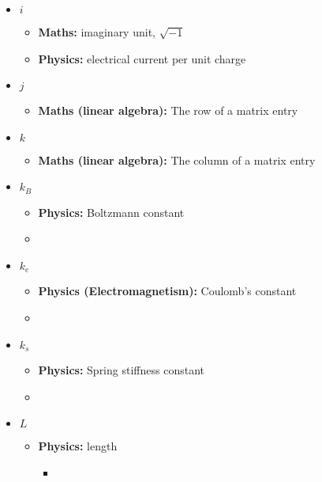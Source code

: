 \begin{itemize}
				\item $i$
				\begin{itemize}
					\item \textbf{Maths:} imaginary unit, $\sqrt{-1}$
					\item\textbf{Physics:} electrical current per unit charge
				\end{itemize}
				
				\item $j$
				\begin{itemize}
					\item\textbf{Maths (linear algebra):} The row of a matrix entry
				\end{itemize}
				
				\item $k$
				\begin{itemize}
					\item\textbf{Maths (linear algebra):} The column of a matrix entry
				\end{itemize}
				
				\item $k_B$
				\begin{itemize}
					\item\textbf{Physics:} Boltzmann constant
					\item
				\end{itemize}
				
				\item $k_e$
				\begin{itemize}
					\item\textbf{Physics (Electromagnetism):} Coulomb's constant
					\item
				\end{itemize}
				
				\item $k_s$
				\begin{itemize}
					\item\textbf{Physics:} Spring stiffness constant
					\item
				\end{itemize}
				
				\item $L$
				\begin{itemize}
					\item\textbf{Physics:} length
					\begin{itemize}
						\item 
					\end{itemize}
				\end{itemize}
				

\end{itemize}
